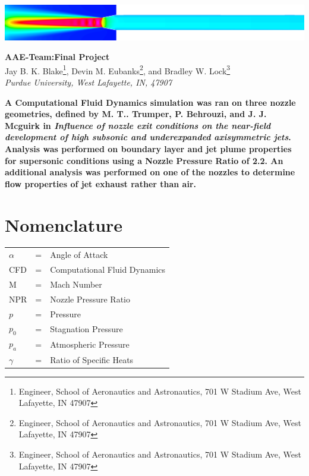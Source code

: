 \documentclass[12pt]{article} %
\title{\classnumber\:\reportnumber}
\author{Jay Blake\\Devin Eubanks\\Brad Lock\\Purdue University}
\newcommand{\classnumber}{AAE\:412\:-\:Team\:32:}
\newcommand{\reportnumber}{Final Project}
\begin{document}
\maketitle
\vspace{2in}
\begin{center}
    \includegraphics[width=\linewidth]{CoverPicture.png}
\end{center}
\clearpage
\begin{center}
{\Large\textbf{\classnumber\:\reportnumber}}\\
\vspace*{24pt}
Jay B. K. Blake\footnote{Engineer, School of Aeronautics and Astronautics, 701 W Stadium Ave, West Lafayette, IN 47907}, Devin M. Eubanks\footnote{Engineer, School of Aeronautics and Astronautics, 701 W Stadium Ave, West Lafayette, IN 47907}, and Bradley W. Lock\footnote{Engineer, School of Aeronautics and Astronautics, 701 W Stadium Ave, West Lafayette, IN 47907}\\
\textit{Purdue University, West Lafayette, IN, 47907}
\end{center}
\vspace*{36pt}
\textbf{\hspace{36pt}A Computational Fluid Dynamics simulation was ran on three nozzle geometries, defined by M. T.. Trumper, P. Behrouzi, and J. J. Mcguirk in \textit{Influence  of  nozzle  exit  conditions on  the  near-field  development  of  high  subsonic  and  underexpanded  axisymmetric  jets}. Analysis was performed on boundary layer and jet plume properties for supersonic conditions using a Nozzle Pressure Ratio of 2.2. An additional analysis was performed on one of the nozzles to determine flow properties of jet exhaust rather than air.}
\vspace*{36pt}
\section*{Nomenclature}
\begin{table}[ht]
    \begin{tabular}{l c l}
       $\alpha$&=&Angle of Attack\\
       CFD&=&Computational Fluid Dynamics\\
         M&=&Mach Number\\
         NPR&=&Nozzle Pressure Ratio\\
         $p$&=&Pressure\\
         $p_0$&=&Stagnation Pressure\\
         $p_a$&=&Atmospheric Pressure\\
         $\gamma$&=&Ratio of Specific Heats
    \end{tabular}
    \label{tab:nomenclature}
\end{table}
\clearpage
\end{document}
